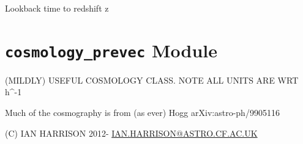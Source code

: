 \documentclass[letterpaper,10pt,english]{sphinxmanual}
\begin{document}
\begin{fulllineitems}
\begin{fulllineitems}
\end{fulllineitems}


\begin{fulllineitems}
\label{PyCosmo:PyCosmo.cosmology.Cosmology.t_lookback}
Lookback time to redshift z

\end{fulllineitems}


\end{fulllineitems}



\section{\texttt{cosmology\_prevec} Module}
\label{PyCosmo:module-PyCosmo.cosmology_prevec}\label{PyCosmo:cosmology-prevec-module}
(MILDLY) USEFUL COSMOLOGY CLASS.
NOTE ALL UNITS ARE WRT h\textasciicircum{}-1

Much of the cosmography is from (as ever) Hogg arXiv:astro-ph/9905116

(C) IAN HARRISON
2012-
\href{mailto:IAN.HARRISON@ASTRO.CF.AC.UK}{IAN.HARRISON@ASTRO.CF.AC.UK}
\end{document}
